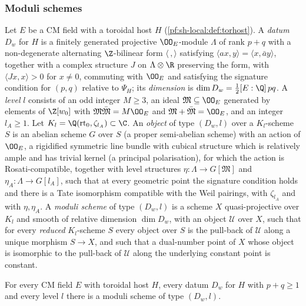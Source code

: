 \subsubsection{Moduli schemes}
\begin{definition}\label{pf:sh-local:def:moduli}
Let $E$ be a CM field with a toroidal host $H$ (\cref{pf:sh-local:def:torhost}). A \emph{datum} $D_w$ for $H$ is a
finitely generated projective $\OO_E$-module $\Lambda$ of rank $p+q$ with a non-degenerate alternating $\Z$-bilinear
form $\langle\,,\rangle$ satisfying $\langle ax,y\rangle=\langle x,\bar ay\rangle$, together with a complex structure
$J$ on $\Lambda\otimes\R$ preserving the form, with $\langle Jx,x\rangle>0$ for $x\ne0$, commuting with $\OO_E$ and
satisfying the signature condition for $(p,q)$ relative to $\Psi_H$; its \emph{dimension} is
$\dim D_w=\frac12[E:\Q]\,pq$. A \emph{level} $l$ consists of an odd integer $M\ge3$, an ideal $\mathfrak M\subseteq\OO_E$
generated by elements of $\Z[w_0]$ with $\mathfrak M\bar{\mathfrak M}=M\OO_E$ and $\mathfrak M+\bar{\mathfrak M}=\OO_E$,
and an integer $l_A\ge1$. Let $K_l=\Q(\mathrm{rt}_0,\zeta_{l_A})\subset\C$. An \emph{object} of type $(D_w,l)$ over a
$K_l$-scheme $S$ is an abelian scheme $G$ over $S$ (a proper semi-abelian scheme) with an action of $\OO_E$, a
rigidified symmetric line bundle with cubical structure which is relatively ample and has trivial kernel (a principal
polarisation), for which the action is Rosati-compatible, together with level structures $\eta:\Lambda\to
G[\mathfrak M]$ and $\eta_A:\Lambda\to G[l_A]$, such that at every geometric point the signature condition holds and
there is a Tate isomorphism compatible with the Weil pairings, with $\zeta_{l_A}$ and with $\eta,\eta_A$. A
\emph{moduli scheme} of type $(D_w,l)$ is a scheme $X$ quasi-projective over $K_l$ and smooth of relative dimension
$\dim D_w$, with an object $\mathcal U$ over $X$, such that for every \emph{reduced} $K_l$-scheme $S$ every object over
$S$ is the pull-back of $\mathcal U$ along a unique morphism $S\to X$, and such that a dual-number point of $X$ whose
object is isomorphic to the pull-back of $\mathcal U$ along the underlying constant point is constant.
\end{definition}

\begin{theorem}\label{pf:sh-local:moduli}
For every CM field $E$ with toroidal host $H$, every datum $D_w$ for $H$ with $p+q\ge1$ and every level $l$ there is a
moduli scheme of type $(D_w,l)$.
\end{theorem}

